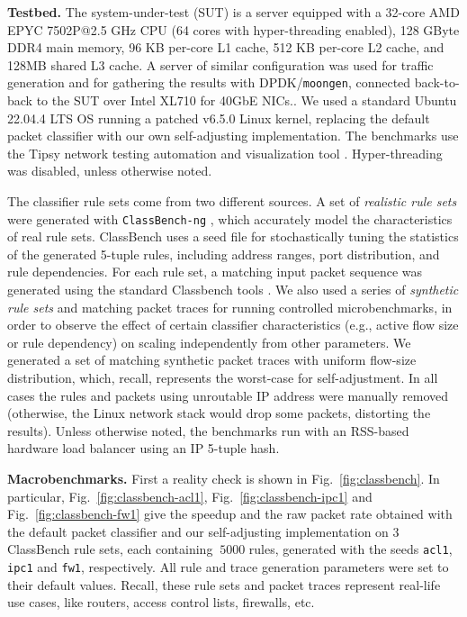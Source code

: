 \noindent
\textbf{Testbed.} %
The system-under-test (SUT) is a server equipped with a 32-core AMD EPYC 7502P@2.5 GHz CPU (64 cores with hyper-threading enabled), 128 GByte DDR4 main memory, 96 KB per-core L1 cache, 512 KB per-core L2 cache, and 128MB shared L3 cache. A server of similar configuration was used for traffic generation and for gathering the results with DPDK\slash \texttt{moongen}, connected back-to-back to the SUT over Intel XL710 for 40GbE NICs.. We used a standard Ubuntu 22.04.4 LTS OS running a patched v6.5.0 Linux kernel, replacing the default \nftables packet classifier with our own self-adjusting implementation. The benchmarks use the Tipsy network testing automation and visualization tool \cite{8468219}. Hyper-threading was disabled, unless otherwise noted.

The classifier rule sets come from two different sources. A set of \emph{realistic rule sets} were generated with \texttt{ClassBench-ng} \cite{10.1109/ANCS.2017.33, 4237157}, which accurately model the characteristics of real rule sets. ClassBench uses a seed file for stochastically tuning the statistics of the generated 5-tuple rules, including address ranges, port distribution, and rule dependencies. %
For each rule set, a matching input packet sequence was generated using the standard Classbench tools \cite{10.1109/ANCS.2017.33,classbench-pcap}. We also used a series of \emph{synthetic rule sets} and matching packet traces for running controlled microbenchmarks, in order to observe the effect of certain classifier characteristics (e.g., active flow size or rule dependency) on scaling independently from other parameters. We generated a set of matching synthetic packet traces with uniform flow-size distribution, which, recall, represents the worst-case for self-adjustment.  In all cases the rules and packets using unroutable IP address were manually removed (otherwise, the Linux network stack would drop some packets, distorting the results). Unless otherwise noted, the benchmarks run with an RSS-based hardware load balancer using an IP 5-tuple hash.

\noindent
\textbf{Macrobenchmarks.} %
First a reality check is shown in Fig.~\ref{fig:classbench}. In particular, Fig.~\ref{fig:classbench-acl1}, Fig.~\ref{fig:classbench-ipc1} and Fig.~\ref{fig:classbench-fw1} give the speedup and the raw packet rate obtained with the default \nftables packet classifier and our self-adjusting implementation on 3 ClassBench rule sets, each containing $~5000$ rules, generated with the seeds \texttt{acl1}, \texttt{ipc1} and \texttt{fw1}, respectively. All rule and trace generation parameters were set to their default values. Recall, these rule sets and packet traces represent real-life use cases, like routers, access control lists, firewalls, etc.

